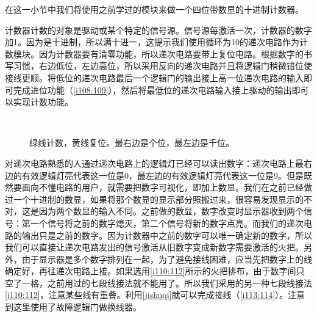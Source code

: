 在这一小节中我们将使用之前学过的模块来做一个四位带数显的十进制计数器。

计数器计数的对象是驱动或某个特定的信号源。信号源每激活一次，计数器的数字加1。因为是十进制，所以满十进一，这提示我们使用循环为10的递次电路作为计数模块。因为计数器要有清零功能，所以递次电路要带上复位电路。根据数字的书写习惯，右边低位，左边高位，所以采用反向的递次电路并且将逻辑门稍微错位使接线更顺。将低位的递次电路最后一个逻辑门的输出接上高一位递次电路的输入即可完成进位功能（\autoref{i108:109}），然后将最低位的递次电路输入接上驱动的输出即可以实现计数功能。

\begin{figure}[!h]
\begin{center}
\\
\end{center}
\caption{绿线计数，黄线复位。最右边是个位，最左边是千位。}
\label{i108:109}
\end{figure}

对递次电路熟悉的人通过递次电路上的逻辑灯已经可以读出数字：递次电路上最右边的有效逻辑灯亮代表这一位是0，最左边的有效逻辑灯亮代表这一位是9。但是既然要面向不懂电路的用户，就需要把数字可视化，即加上数显。我们在之前已经做过一个十进制的数显，如果将那个数显的显示部分照搬过来，很容易发现显示的不对，这是因为两个数显的输入不同。之前做的数显，数字改变时显示器收到两个信号：第一个信号将之前的数字熄灭，第二个信号将新的数字点亮。而我们的递次电路的输出只是之前的数字。因为计数器中之前的数字可以唯一确定新的数字，所以我们可以直接让递次电路发出的信号激活从旧数字变成新数字需要激活的火把。另外，由于显示器是多个数字排列在一起，为了避免接线困难，应当先把数字上的线确定好，再往递次电路上接。如果选用\autoref{i110:112}所示的火把排布，由于数字间只空了一格，之前用过的七段线接法就不能用了。所以我们采用的另一种七段线接法\autoref{i110:112}，注意某些线有重叠。利用\autoref{jishuqi}就可以完成接线（\autoref{i113:114}）。注意到这里使用了故障逻辑门做换线器。

